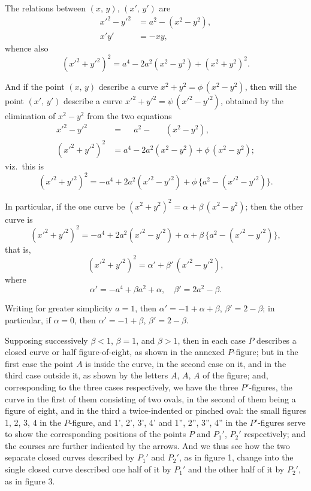 \documentclass[12pt,a4paper]{article}
\begin{document}
The relations between $(x,\,y)$, $(x',\,y')$ are
\begin{align*}
x'^2 - y'^2 &= a^2 - (x^2 - y^2), \\
x'y' &= -xy,
\end{align*}
whence also
\[
(x'^2 + y'^2)^2 = a^4 - 2a^2(x^2-y^2) + (x^2+y^2)^2.
\]

And if the point $(x,\,y)$ describe a curve $x^2+y^2 = \phi\,(x^2-y^2)$, then will the point $(x',\,y')$ describe a curve $x'^2+y'^2 = \psi\,(x'^2-y'^2)$, obtained by the elimination of $x^2-y^2$ from the two equations
\begin{align*}
x'^2 - y'^2 &= \phantom{-}a^2 - \phantom{2a^2\,}(x^2-y^2), \\
(x'^2+y'^2)^2 &= a^4 - 2a^2(x^2-y^2) + \phi\,(x^2-y^2);
\end{align*}
viz.\ this is
\[
(x'^2+y'^2)^2 = -a^4 + 2a^2(x'^2-y'^2) + \phi\,\{a^2 - (x'^2-y'^2)\}.
\]

In particular, if the one curve be $(x^2+y^2)^2 = \alpha + \beta\,(x^2-y^2)$; then the other curve is
\[
(x'^2+y'^2)^2 = -a^4 + 2a^2(x'^2-y'^2) + \alpha + \beta\,\{a^2 - (x'^2-y'^2)\},
\]
that is,
\[
(x'^2+y'^2)^2 = \alpha' + \beta'\,(x'^2-y'^2),
\]
where
\[
\alpha' = -a^4 + \beta a^2 + \alpha, \quad \beta' = 2a^2 - \beta.
\]

Writing for greater simplicity $a=1$, then $\alpha' = -1 + \alpha + \beta$, $\beta' = 2 - \beta$; in particular, if $\alpha = 0$, then $\alpha' = -1 + \beta$, $\beta' = 2 - \beta$.

Supposing successively $\beta < 1$, $\beta = 1$, and $\beta > 1$, then in each case $P$ describes a closed curve or half figure-of-eight, as shown in the annexed $P$-figure; but in the first case the point $A$ is inside the curve, in the second case on it, and in the third case outside it, as shown by the letters $A$, $A$, $A$ of the figure; and, corresponding to the three cases respectively, we have the three $P'$-figures, the curve in the first of them consisting of two ovals, in the second of them being a figure of eight, and in the third a twice-indented or pinched oval: the small figures 1, 2, 3, 4 in the $P$-figure, and 1', 2', 3', 4' and 1'', 2'', 3'', 4'' in the $P'$-figures serve to show the corresponding positions of the points $P$ and $P_1'$, $P_2'$ respectively; and the courses are further indicated by the arrows. And we thus see how the two separate closed curves described by $P_1'$ and $P_2'$, as in figure 1, change into the single closed curve described one half of it by $P_1'$ and the other half of it by $P_2'$, as in figure 3.
\end{document}
